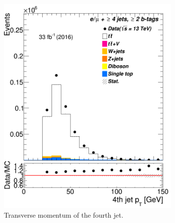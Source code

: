 \begin{figure}
\begin{subfigure}{0.25\textwidth}
	\includegraphics[width=\linewidth]{ControlPlots_emujets_2016_4incl_2incl/jet3_pt_emujets_2016.png}
	\caption{Transverse momentum of the fourth jet.} \label{fig:4xb}
\end{subfigure}\hspace*{1.0cm}
\begin{subfigure}{0.25\textwidth}

\end{subfigure}
\end{figure}
